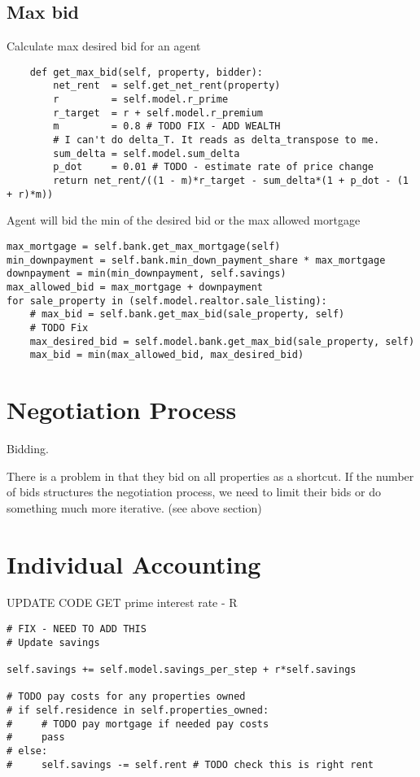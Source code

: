 \subsection{Max bid}

Calculate max desired bid for an agent
\begin{lstlisting}
    def get_max_bid(self, property, bidder):
        net_rent  = self.get_net_rent(property)
        r         = self.model.r_prime   
        r_target  = r + self.model.r_premium
        m         = 0.8 # TODO FIX - ADD WEALTH
        # I can't do delta_T. It reads as delta_transpose to me.
        sum_delta = self.model.sum_delta 
        p_dot     = 0.01 # TODO - estimate rate of price change
        return net_rent/((1 - m)*r_target - sum_delta*(1 + p_dot - (1 + r)*m))
\end{lstlisting}

Agent will bid the min of the desired bid or the max allowed mortgage
\begin{lstlisting}
max_mortgage = self.bank.get_max_mortgage(self)
min_downpayment = self.bank.min_down_payment_share * max_mortgage
downpayment = min(min_downpayment, self.savings)
max_allowed_bid = max_mortgage + downpayment
for sale_property in (self.model.realtor.sale_listing):
    # max_bid = self.bank.get_max_bid(sale_property, self)
    # TODO Fix
    max_desired_bid = self.model.bank.get_max_bid(sale_property, self)
    max_bid = min(max_allowed_bid, max_desired_bid)
\end{lstlisting}

\section{Negotiation Process}

Bidding.

There is a problem in that they bid on all properties as a shortcut. If the number of bids structures the negotiation process, we need to limit their bids or do something much more iterative. (see above section)


\section{Individual Accounting}
UPDATE CODE
GET prime interest rate - R
\begin{lstlisting}
# FIX - NEED TO ADD THIS
# Update savings

self.savings += self.model.savings_per_step + r*self.savings

# TODO pay costs for any properties owned
# if self.residence in self.properties_owned:
#     # TODO pay mortgage if needed pay costs
#     pass
# else:
#     self.savings -= self.rent # TODO check this is right rent
\end{lstlisting}